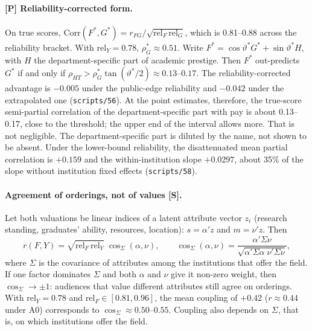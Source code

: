 \paragraph{[P] Reliability-corrected form.} On true scores,
$\mathrm{Corr}(F^*,G^*)=r_{FG}/\sqrt{\mathrm{rel}_F\,\mathrm{rel}_G}$, which is 0.81--0.88 across the reliability
bracket. With $\mathrm{rel}_Y=0.78$, $\rho^*_G\approx0.51$. Write $F^*=\cos\vartheta^*G^*+\sin\vartheta^*H$, with $H$
the department-specific part of academic prestige. Then $F^*$ out-predicts $G^*$ if and only if
$\rho_{HT}>\rho^*_G\tan(\vartheta^*/2)\approx0.13$--$0.17$. The reliability-corrected advantage is $-0.005$
 under the public-edge reliability and $-0.042$  under the extrapolated one
(\texttt{scripts/56}). At the point estimates, therefore, the true-score semi-partial correlation of the
department-specific part with pay is about 0.13--0.17, close to the threshold; the upper end of the interval
allows more. That is not negligible. The department-specific part is diluted by the name, not shown to be absent.
Under the lower-bound reliability, the disattenuated mean partial correlation is $+0.159$  and
the within-institution slope $+0.0297$, about 35\% of the slope without institution fixed effects
(\texttt{scripts/58}).

\paragraph{Agreement of orderings, not of values [S].} Let both valuations be linear indices of a latent
attribute vector $z_i$ (research standing, graduates' ability, resources, location): $s=\alpha'z$ and $m=\nu'z$.
Then
\[
r(F,Y)=\sqrt{\mathrm{rel}_F\,\mathrm{rel}_Y}\;\cos_\Sigma(\alpha,\nu),\qquad
\cos_\Sigma(\alpha,\nu)=\frac{\alpha'\Sigma\nu}{\sqrt{\alpha'\Sigma\alpha\;\nu'\Sigma\nu}} ,
\]
where $\Sigma$ is the covariance of attributes among the institutions that offer the field. If one factor dominates
$\Sigma$ and both $\alpha$ and $\nu$ give it non-zero weight, then $\cos_\Sigma\to\pm1$: audiences that value
different attributes still agree on orderings. With $\mathrm{rel}_Y=0.78$ and $\mathrm{rel}_F\in[0.81,0.96]$, the
mean coupling of $+0.42$ ($r\approx0.44$ under A0) corresponds to $\cos_\Sigma\approx0.50$--$0.55$. Coupling also
depends on $\Sigma$, that is, on which institutions offer the field.

